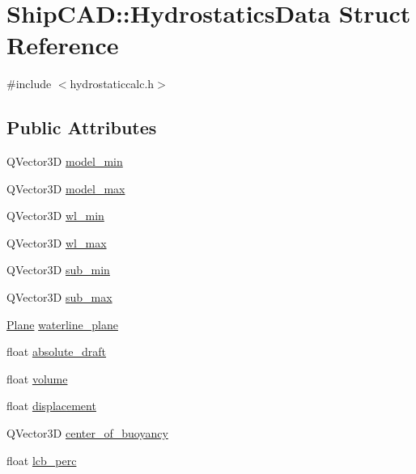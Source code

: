 \hypertarget{structShipCAD_1_1HydrostaticsData}{\section{Ship\-C\-A\-D\-:\-:Hydrostatics\-Data Struct Reference}
\label{structShipCAD_1_1HydrostaticsData}
}


{\ttfamily \#include $<$hydrostaticcalc.\-h$>$}

\subsection*{Public Attributes}
\begin{DoxyCompactItemize}
\item 
Q\-Vector3\-D \hyperlink{structShipCAD_1_1HydrostaticsData_acd93669bc08fa097974d41fbaf4dc81f}{model\-\_\-min}
\item 
Q\-Vector3\-D \hyperlink{structShipCAD_1_1HydrostaticsData_a9319fb2ad054a595b6e3b3fd4059a3ae}{model\-\_\-max}
\item 
Q\-Vector3\-D \hyperlink{structShipCAD_1_1HydrostaticsData_a3bb2750b6306d9e8ae09bb4eebb1ed0c}{wl\-\_\-min}
\item 
Q\-Vector3\-D \hyperlink{structShipCAD_1_1HydrostaticsData_a332be807e8373521c238d82b9dcedc38}{wl\-\_\-max}
\item 
Q\-Vector3\-D \hyperlink{structShipCAD_1_1HydrostaticsData_a2d0a1e5f6bf98f8eceb958e5f7e7c73e}{sub\-\_\-min}
\item 
Q\-Vector3\-D \hyperlink{structShipCAD_1_1HydrostaticsData_ab3a6e316a991426c74673025439f123c}{sub\-\_\-max}
\item 
\hyperlink{classShipCAD_1_1Plane}{Plane} \hyperlink{structShipCAD_1_1HydrostaticsData_af93141f846f6622bb146cda042962303}{waterline\-\_\-plane}
\item 
float \hyperlink{structShipCAD_1_1HydrostaticsData_a6857139c04212164c5557cc816f80345}{absolute\-\_\-draft}
\item 
float \hyperlink{structShipCAD_1_1HydrostaticsData_acfbee81bded1b067a23cfc8cc9c00855}{volume}
\item 
float \hyperlink{structShipCAD_1_1HydrostaticsData_a92d1a8a97eb9b21bad485e40ac4461a0}{displacement}
\item 
Q\-Vector3\-D \hyperlink{structShipCAD_1_1HydrostaticsData_a316b31598f53f036c7008cc4910293f8}{center\-\_\-of\-\_\-buoyancy}
\item 
float \hyperlink{structShipCAD_1_1HydrostaticsData_a783b71d811732bbc002b52f21d63c83a}{lcb\-\_\-perc}

\end{DoxyCompactItemize}
